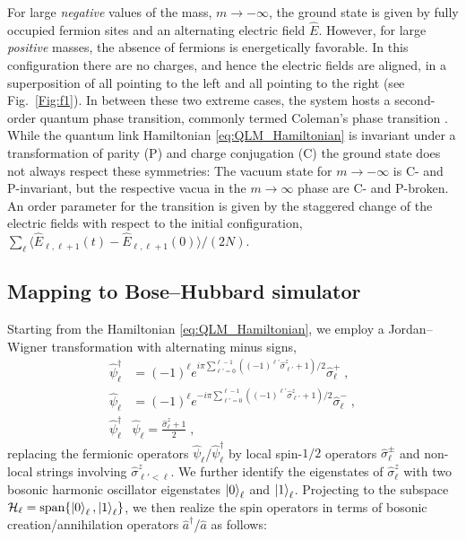 \documentclass[aps,prl,twocolumn,superscriptaddress,footinbib,linenumbers]{revtex4}
\begin{document}
For large \emph{negative} values of the mass, $m\rightarrow -\infty$, the ground state is given by fully occupied fermion sites and an alternating electric field $\hat{E}$.
However, for large \emph{positive} masses, the absence of fermions is energetically favorable. In this configuration there are no charges, and hence the electric fields are aligned, in a superposition of all pointing to the left and all pointing to the right (see Fig.~\ref{Fig:f1}). In between these two extreme cases, the system hosts a second-order quantum phase transition, commonly termed Coleman's phase transition \cite{Coleman:1976,Pichler:2016s}. While the quantum link Hamiltonian \eqref{eq:QLM_Hamiltonian} is invariant under a transformation \cite{Pichler:2016s} of parity (P) and charge conjugation (C) the ground state does not always respect these symmetries: The vacuum state for $m\rightarrow -\infty$ is C- and P-invariant, but the respective vacua in the $m\rightarrow \infty$ phase are C- and P-broken. An order parameter for the transition is given by the staggered change of the electric fields with respect to the initial configuration, $\sum_{\ell} \langle\hat{E}_{\ell,\ell+1}(t)- \hat{E}_{\ell,\ell+1}(0)\rangle/(2N)$.

\subsection{Mapping to Bose--Hubbard simulator}

Starting from the Hamiltonian \ref{eq:QLM_Hamiltonian}, we employ a Jordan--Wigner transformation with alternating minus signs,
\begin{subequations}
\begin{align}
\label{eq:JW}
\hat{\psi}_\ell^{\dagger} &= (-1)^{\ell} e^{i\pi \sum_{\ell'=0}^{\ell-1} ((-1)^{\ell'}\hat{\sigma}^{z}_{\ell'}+1)/2 } \hat{\sigma}_\ell^{+} \; ,\\
\hat{\psi}_\ell &= (-1)^{\ell} e^{-i\pi \sum_{\ell'=0}^{\ell-1} ((-1)^{\ell'}\hat{\sigma}^{z}_{\ell'}+1)/2 } \hat{\sigma}_\ell^{-} \; ,\\
\hat{\psi}^{\dagger}_\ell & \hat{\psi}_\ell = \frac{\hat{\sigma}^{z}_\ell+1}{2} \; ,
\end{align}
\end{subequations}
replacing the fermionic operators $\hat{\psi}_{\ell}$/$\hat{\psi}^{\dagger}_{\ell}$ by local spin-$1/2$ operators $\hat{\sigma}^{\pm}_{\ell}$ and non-local strings involving $\hat{\sigma}^{z}_{\ell'<\ell}$. We further identify the eigenstates of $\hat{\sigma}^z_\ell$ with two bosonic harmonic oscillator eigenstates $\ket{0}_{\ell}$ and $\ket{1}_{\ell}$. Projecting to the subspace $\mathcal{H}_{\ell} = \text{span}\{\ket{0}_\ell,\ket{1}_\ell\}$, we then realize the spin operators in terms of bosonic creation/annihilation operators $\hat{a}^{\dagger}$/$\hat{a}$ as follows:
\end{document}

